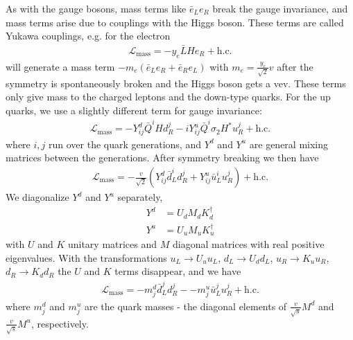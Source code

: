 As with the gauge bosons, mass terms like $\bar{e}_L e_R$ break the gauge invariance, and mass terms arise due to couplings with the Higgs boson.
These terms are called Yukawa couplings, e.g. for the electron
\begin{align}
  \mathcal{L}_\text{mass} = -y_e\bar{L}He_R + \text{h.c.}
\end{align}
will generate a mass term $-m_e (\bar{e}_Le_R+\bar{e}_Re_L)$ with $m_e = \frac{y_e}{\sqrt{2}}v $ after the symmetry is spontaneously broken and the Higgs boson gets a vev.
These terms only give mass to the charged leptons and the down-type quarks.
For the up quarks, we use a slightly different term for gauge invariance:
\begin{align}
  \mathcal{L}_\text{mass} = -Y^d_{ij}\bar{Q}^i H d_R^j - iY_{ij}^u\bar{Q}^i\sigma_2H^*u_R^j + \text{h.c.}
\end{align}
where $i,j$ run over the quark generations, and $Y^d$ and $Y^u$ are general mixing matrices between the generations.
After symmetry breaking we then have
\begin{align}
  \mathcal{L}_\text{mass} = -\frac{v}{\sqrt{2}}\left(Y_{ij}^d\bar{d}_L^id_R^j + Y_{ij}^u\bar{u}_L^iu_R^j\right) + \text{h.c.}
\end{align}
We diagonalize $Y^d$ and $Y^u$ separately,
\begin{align}
  Y^d &= U_dM_dK_d^\dagger\\
  Y^u &= U_uM_uK_u^\dagger
\end{align}
with $U$ and $K$ unitary matrices and $M$ diagonal matrices with real positive eigenvalues.
With the transformations $u_L\rightarrow U_u u_L$, $d_L\rightarrow U_d d_L$, $u_R\rightarrow K_u u_R$, $d_R\rightarrow K_d d_R$ the $U$ and $K$ terms disappear, and we have
\begin{align}
  \mathcal{L}_\text{mass} = -m_j^d \bar{d}_L^jd_R^j - -m_j^u \bar{u}_L^ju_R^j +\text{h.c.}
\end{align}
where $m_j^d$ and $m_j^u$ are the quark masses - the diagonal elements of $\frac{v}{\sqrt{s}}M^d$ and $\frac{v}{\sqrt{s}}M^u$, respectively.

